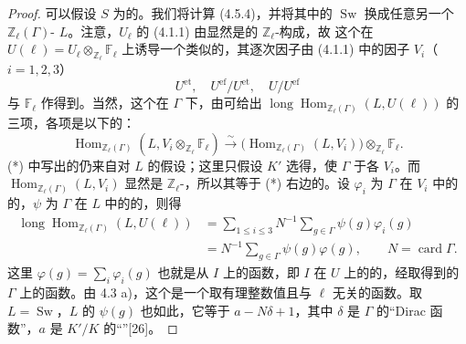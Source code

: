 \begin{proof}
可以假设 $S$ 为的。我们将计算 (4.5.4)，并将其中的 $\operatorname{Sw}$ 换成任意另一个 $\mathbb Z_\ell(\Gamma)$- $L$。注意，$U_\ell$ 的 (4.1.1) 由显然是的 $\mathbb Z_\ell$-构成，故
这个在 $U(\ell)=U_\ell\otimes_{\mathbb Z_\ell}\mathbb F_\ell$ 上诱导一个类似的，其逐次因子由 (4.1.1) 中的因子 $V_i$（$i=1,2,3$）
\[
 U^{\mathrm{et}},\quad U^{\mathrm{ef}}/U^{\mathrm{et}},\quad U/U^{\mathrm{ef}}
\]
与 $\mathbb F_\ell$ 作得到。当然，这个在 $\Gamma$ 下，由可给出 $\operatorname{long}\operatorname{Hom}_{\mathbb Z_\ell(\Gamma)}(L,U(\ell))$ 的三项，各项是以下的：
\[
 \operatorname{Hom}_{\mathbb Z_\ell(\Gamma)}(L,V_i\otimes_{\mathbb Z_\ell}\mathbb F_\ell)
 \xrightarrow{\sim}
 \bigl(\operatorname{Hom}_{\mathbb Z_\ell(\Gamma)}(L,V_i)\bigr)
 \otimes_{\mathbb Z_\ell}\mathbb F_\ell. \tag{*}
\]
(*) 中写出的仍来自对 $L$ 的假设；这里只假设 $K'$ 选得，使 $\Gamma$ 于各 $V_i$。而 $\operatorname{Hom}_{\mathbb Z_\ell(\Gamma)}(L,V_i)$ 显然是 $\mathbb Z_\ell$-，所以其等于 (*) 右边的。设 $\varphi_i$ 为 $\Gamma$ 在 $V_i$ 中的的，$\psi$ 为 $\Gamma$ 在 $L$ 中的的，则得
\begin{align*}
 \operatorname{long}\operatorname{Hom}_{\mathbb Z_\ell(\Gamma)}(L,U(\ell))
 &=\sum_{1\leq i\leq3}N^{-1}\sum_{g\in\Gamma}\psi(g)\varphi_i(g)\\
 &=N^{-1}\sum_{g\in\Gamma}\psi(g)\varphi(g),
 \qquad N=\operatorname{card}\Gamma. \tag{4.6.1}
\end{align*}
这里 $\varphi(g)=\sum_i\varphi_i(g)$ 也就是从 $I$ 上的函数，即 $I$ 在 $U$ 上的的，经取得到的 $\Gamma$ 上的函数。由 4.3 a)，这个是一个取有理整数值且与 $\ell$ 无关的函数。取 $L=\operatorname{Sw}$，$L$ 的 $\psi(g)$ 也如此，它等于 $a-N\delta+1$，其中 $\delta$ 是 $\Gamma$ 的“Dirac 函数”，$a$ 是 $K'/K$ 的“”[26]。

\end{proof}
